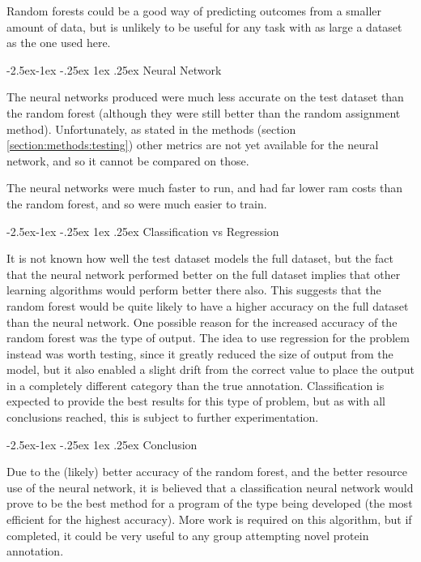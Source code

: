 \documentclass[12pt]{article}
\makeatletter
\renewcommand\subsubsection{\@startsection{subsubsection}{4}{\z@}
            {-2.5ex\@plus -1ex \@minus -.25ex}
            {1ex \@plus .25ex}
            {\normalfont\large\bfseries}}
\renewcommand\subsection{\@startsection{subsection}{4}{\z@}
            {-2.5ex\@plus -1ex \@minus -.25ex}
            {1ex \@plus .25ex}
            {\normalfont\Large\bfseries}}
\makeatother
\begin{document}
			Random forests could be a good way of predicting outcomes from a smaller amount of data, but is unlikely to be useful for any task with as large a dataset as the one used here.
			
			\subsubsection{Neural Network}
			
			The neural networks produced were much less accurate on the test dataset than the random forest (although they were still better than the random assignment method).  Unfortunately, as stated in the methods (section \ref{section:methods:testing}) other metrics are not yet available for the neural network, and so it cannot be compared on those.
			
			The neural networks were much faster to run, and had far lower ram costs than the random forest, and so were much easier to train.
			
		\subsection{Classification vs Regression}

		It is not known how well the test dataset models the full dataset, but the fact that the neural network performed better on the full dataset implies that other learning algorithms would perform better there also.  This suggests that the random forest would be quite likely to have a higher accuracy on the full dataset than the neural network.  One possible reason for the increased accuracy of the random forest was the type of output.  The idea to use regression for the problem instead was worth testing, since it greatly reduced the size of output from the model, but it also enabled a slight drift from the correct value to place the output in a completely different category than the true annotation. Classification is expected to provide the best results for this type of problem, but as with all conclusions reached, this is subject to further experimentation.
		
		\subsection{Conclusion}
		
		Due to the (likely) better accuracy of the random forest, and the better resource use of the neural network, it is believed that a classification neural network would prove to be the best method for a program of the type being developed (the most efficient for the highest accuracy).  More work is required on this algorithm, but if completed, it could be very useful to any group attempting novel protein annotation.
		
\end{document}
